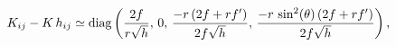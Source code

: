 \begin{equation}
K_{ij}-K\,h_{ij}\simeq {\rm diag}\left(\frac{2f}{r\sqrt{h}},\,0,\,\frac{
-r\,(2f+rf')}{2f\sqrt{h}},\,\frac{
-r\,\sin^2(\theta)\,(2f+rf')}{2f\sqrt{h}}\right),\label{eq:K}\end{equation}

